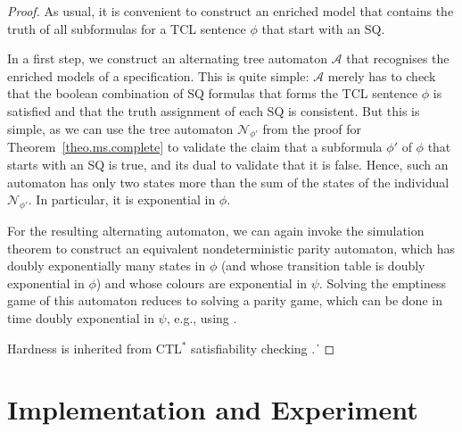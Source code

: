 \documentclass{llncs}
\def\qed{\ifmmode\|\else{\unskip\nobreak\hfil
\penalty50\hskip1em\null\nobreak\hfil$\blacksquare$
\parfillskip=0pt\finalhyphendemerits=0\endgraf}\fi}
\begin{document}
\begin{proof}
As usual, it is convenient to construct an enriched model that contains the truth of all subformulas for a TCL sentence $\phi$ that start with an SQ.

In a first step, we construct an alternating tree automaton $\mathcal A$ that recognises the enriched models of a specification.
This is quite simple:
$\mathcal A$ merely has to check that the boolean combination of SQ formulas that forms the TCL sentence $\phi$ is satisfied and that the truth assignment of each SQ is consistent.
But this is simple, as we can use the tree automaton 
$\mathcal N_{\phi'}$ from the proof for Theorem~\ref{theo.ms.complete}  
to validate the claim that a subformula $\phi'$ of $\phi$ that starts with an SQ is true, and its dual to validate that it is false.
Hence, such an automaton has only two states more than the sum of the states of the individual $\mathcal N_{\phi'}$. In particular, it is exponential in $\phi$.


% 

For the resulting alternating automaton, we can again invoke the simulation theorem \cite{Muller+Schupp/95/Alternating} to construct an equivalent nondeterministic parity automaton, which has doubly exponentially many states in $\phi$ (and whose transition table is doubly exponential in $\phi$) and whose colours are exponential in $\psi$.
Solving the emptiness game of this automaton reduces to solving a parity game, which can be done in time doubly exponential in $\psi$, e.g., using \cite{Schewe/07/parity}.

Hardness is inherited from CTL$^*$ satisfiability checking \cite{Vardi+Stockmeyer/85/CTL}.
\qed
\end{proof}



\section{Implementation and Experiment \label{sec.imp.exp}} 
\end{document}
